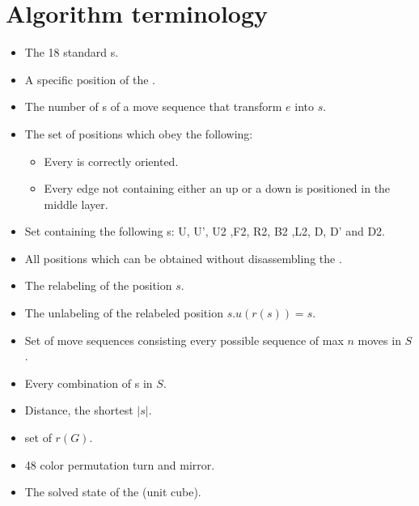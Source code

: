 \section{Algorithm terminology}
\begin{itemize}
\item {}The 18 standard \twist{}s.
\item {}A specific position of the \rubik{}.
\item {}The number of \twist{}s of a move sequence that transform $e$ into $s$.
\item {}The set of positions which obey the following:
\begin{itemize}
	\item Every \cpiece{} is correctly oriented.
	\item Every edge \cpiece{} not containing either an up \facelet{} or a down \facelet{} is positioned in the middle layer.
\end{itemize}
\item {}Set containing the following \twist{}s: U, U', U2 ,F2, R2, B2 ,L2, D, D' and D2.
\item {}All positions which can be obtained without disassembling the \rubik{}. 
\item {}The relabeling of the position $s$.
\item {}The unlabeling of the relabeled position $s$.$u(r(s))=s$.
\item {}Set of move sequences consisting every possible sequence of max $n$ moves in $S$.
\item {}Every combination of \twist{}s in $S$.
\item {}Distance, the shortest $|s|$.
\item {}set of $r(G)$.
\item {}48 color permutation turn and mirror.
\item {}The solved state of the \rubik{}(unit cube).
\end{itemize}

